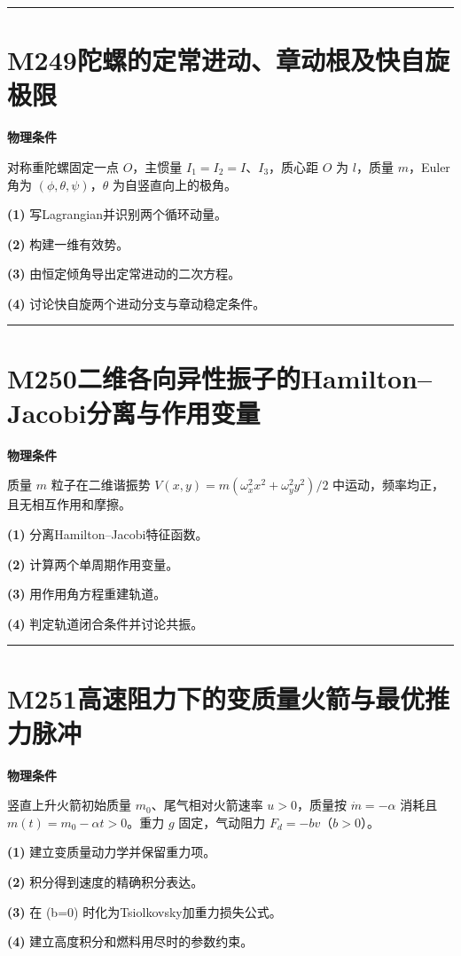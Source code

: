\documentclass[UTF8,a4paper,11pt,oneside,openany]{ctexbook}
\begin{document}
\par\bigskip\hrule\bigskip
\section*{M249\quad 陀螺的定常进动、章动根及快自旋极限}
\textbf{物理条件}\par 对称重陀螺固定一点 \(O\)，主惯量 \(I_1=I_2=I\)、\(I_3\)，质心距 \(O\) 为 \(l\)，质量 \(m\)，Euler角为 \((\phi,\theta,\psi)\)，\(\theta\) 为自竖直向上的极角。
\par\noindent\textbf{(1)} 写Lagrangian并识别两个循环动量。
\par\noindent\textbf{(2)} 构建一维有效势。
\par\noindent\textbf{(3)} 由恒定倾角导出定常进动的二次方程。
\par\noindent\textbf{(4)} 讨论快自旋两个进动分支与章动稳定条件。

\par\bigskip\hrule\bigskip
\section*{M250\quad 二维各向异性振子的Hamilton–Jacobi分离与作用变量}
\textbf{物理条件}\par 质量 \(m\) 粒子在二维谐振势 \(V(x,y)=m(\omega_x^2x^2+\omega_y^2y^2)/2\) 中运动，频率均正，且无相互作用和摩擦。
\par\noindent\textbf{(1)} 分离Hamilton–Jacobi特征函数。
\par\noindent\textbf{(2)} 计算两个单周期作用变量。
\par\noindent\textbf{(3)} 用作用角方程重建轨道。
\par\noindent\textbf{(4)} 判定轨道闭合条件并讨论共振。

\par\bigskip\hrule\bigskip
\section*{M251\quad 高速阻力下的变质量火箭与最优推力脉冲}
\textbf{物理条件}\par 竖直上升火箭初始质量 \(m_0\)、尾气相对火箭速率 \(u>0\)，质量按 \(\dot m=-\alpha\) 消耗且 \(m(t)=m_0-\alpha t>0\)。重力 \(g\) 固定，气动阻力 \(F_d=-bv\)（\(b>0\)）。
\par\noindent\textbf{(1)} 建立变质量动力学并保留重力项。
\par\noindent\textbf{(2)} 积分得到速度的精确积分表达。
\par\noindent\textbf{(3)} 在 (b=0) 时化为Tsiolkovsky加重力损失公式。
\par\noindent\textbf{(4)} 建立高度积分和燃料用尽时的参数约束。
\end{document}
